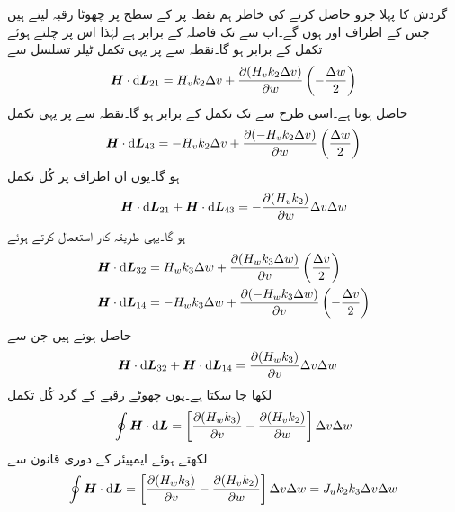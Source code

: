 گردش کا پہلا جزو حاصل کرنے کی خاطر ہم نقطہ  پر  کے   سطح پر چھوٹا رقبہ لیتے ہیں جس کے اطراف  اور  ہوں گے۔اب  سے  تک فاصلہ  کے برابر ہے لہٰذا اس پر چلتے ہوئے  تکمل  کے برابر ہو گا۔نقطہ  سے   پر یہی تکمل ٹیلر تسلسل سے
\begin{align*}
\kvec{H} \cdot \dif \kvec{L}_{21}=H_v k_2 \Delta v+\frac{\partial (H_v k_2 \Delta v)}{\partial w}\left(-\frac{\Delta w}{2}\right)
\end{align*}
حاصل ہوتا ہے۔اسی طرح  سے  تک  تکمل  کے برابر ہو گا۔نقطہ  سے   پر یہی تکمل
\begin{align*}
\kvec{H} \cdot \dif \kvec{L}_{43}=-H_v k_2 \Delta v+\frac{\partial (-H_v k_2 \Delta v)}{\partial w}\left(\frac{\Delta w}{2}\right)
\end{align*}
ہو گا۔یوں ان اطراف پر کُل تکمل
\begin{align}
\kvec{H} \cdot \dif \kvec{L}_{21}+\kvec{H} \cdot \dif \kvec{L}_{43}=-\frac{\partial (H_v k_2)}{\partial w} \Delta v\Delta w
\end{align}
ہو گا۔یہی طریقہ کار استعمال کرتے ہوئے
\begin{align*}
\kvec{H} \cdot \dif \kvec{L}_{32}&=H_w k_3 \Delta w+\frac{\partial (H_w k_3 \Delta w)}{\partial v}\left(\frac{\Delta v}{2}\right)\\
\kvec{H} \cdot \dif \kvec{L}_{14}&=-H_w k_3 \Delta w+\frac{\partial (-H_w k_3 \Delta w)}{\partial v}\left(-\frac{\Delta v}{2}\right)
\end{align*}
حاصل ہوتے ہیں جن سے
\begin{align}
\kvec{H} \cdot \dif \kvec{L}_{32}+\kvec{H} \cdot \dif \kvec{L}_{14}&=\frac{\partial (H_w k_3)}{\partial v}\Delta v  \Delta w
\end{align}
لکھا جا سکتا ہے۔یوں چھوٹے رقبے کے گرد کُل تکمل
\begin{align}
\oint \kvec{H} \cdot \dif \kvec{L}=\left[\frac{\partial (H_w k_3)}{\partial v}-\frac{\partial (H_v k_2)}{\partial w} \right]\Delta v  \Delta w
\end{align}
لکھتے ہوئے ایمپیئر کے دوری قانون سے
\begin{align*}
\oint \kvec{H} \cdot \dif \kvec{L}=\left[\frac{\partial (H_w k_3)}{\partial v}-\frac{\partial (H_v k_2)}{\partial w} \right]\Delta v  \Delta w=J_u {k_2 k_3 \Delta v \Delta w}
\end{align*}
